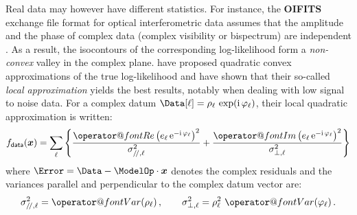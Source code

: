 \documentclass{article}
\makeatletter
\newcommand{\vocab}[1]{\textbf{#1}}
\newcommand{\MathFunc}[1]{\mathop{\operator@font #1}\nolimits}
\newcommand{\Tag}[1]{\mathsf{#1}}        %
\newcommand{\V}[1]{\boldsymbol{#1}}      %
\renewcommand{\Re}{\MathFunc{Re}}        %
\renewcommand{\Im}{\MathFunc{Im}}        %
\newcommand{\Var}{\MathFunc{Var}}        %
\newcommand{\mathe}{\mathrm{e}}
\newcommand{\mathi}{\mathrm{i}}
\newcommand{\Paren}[1]{\left(#1\right)}
\newcommand{\Brace}[1]{\left\{#1\right\}}
\newcommand{\Abs}[1]{\left\vert #1\right\vert}
\newcommand{\Param}{x}
\newcommand{\VParam}{\V{\Param}}
\newcommand{\DataTag}{\Tag{data}}
\newcommand{\Fcost}{f}
\newcommand{\Fdata}{\Fcost_\DataTag}
\newcommand{\Weight}{w}
\newcommand{\OIFITS}{OIFITS\xspace} %
\makeatother
\begin{document}

Real data may however have different statistics.  For instance, the
\vocab{\OIFITS} exchange file format for optical interferometric data assumes
that the amplitude and the phase of complex data (complex visibility or
bispectrum) are independent \citep{Pauls_et_al-2005-oifits}. As a result, the
isocontours of the corresponding log-likelihood form a \emph{non-convex}
valley in the complex plane. \citet{Meimon_et_al-2005-convex_approximation}
have proposed quadratic convex approximations of the true log-likelihood and
have shown that their so-called \emph{local approximation} yields the best
results, notably when dealing with low signal to noise data.  For a complex
datum $\Data[\ell]=\rho_\ell\,\exp(\mathi\,\varphi_\ell)$, their local
quadratic approximation is written:
\begin{equation}
  \label{eq:fdata-local-approx}
  \Fdata(\VParam) = \sum_\ell \Brace{
    \frac{\Re\Paren{e_\ell\,\mathe^{-\mathi\,\varphi_\ell}}^2}
         {\sigma^2_{/\!/,\ell}}
    + \frac{\Im\Paren{e_\ell\,\mathe^{-\mathi\,\varphi_\ell}}^2}
           {\sigma^2_{\perp,\ell}}
  }
\end{equation}
where $\Error = \Data - \ModelOp\cdot\VParam$ denotes the complex residuals
and the variances parallel and perpendicular to the complex datum vector are:
\begin{equation}
  \sigma^2_{/\!/,\ell} = \Var(\rho_\ell) \, , \qquad
  \sigma^2_{\perp,\ell} = \rho_\ell^2\,\Var(\varphi_\ell) \, .
\end{equation}
\end{document}
